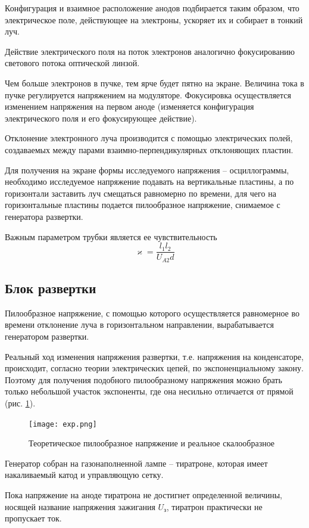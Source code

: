 Конфигурация и взаимное расположение анодов подбирается таким образом, что электрическое поле, действующее на электроны, ускоряет их и собирает в тонкий луч. 

Действие электрического поля на поток электронов аналогично фокусированию светового потока оптической линзой.

Чем больше электронов в пучке, тем ярче будет пятно на экране. Величина тока в пучке регулируется напряжением на модуляторе. Фокусировка осуществляется изменением напряжения на первом аноде (изменяется конфигурация электрического поля и его фокусирующее действие).

Отклонение электронного луча производится с помощью электрических полей, создаваемых между парами взаимно-перпендикулярных отклоняющих пластин. 

Для получения на экране формы исследуемого напряжения -- осциллограммы, необходимо исследуемое напряжение подавать на вертикальные пластины, а по горизонтали заставить луч смещаться равномерно по времени, для чего на горизонтальные пластины подается пилообразное напряжение, снимаемое с генератора развертки.

Важным параметром трубки является ее чувствительность $$\varkappa=\frac{l_1l_2}{U_{A2}d}$$

\subsection{Блок развертки}

Пилообразное напряжение, с помощью которого осуществляется равномерное во времени отклонение луча в горизонтальном направлении, вырабатывается генератором развертки.

Реальный ход изменения напряжения развертки, т.е. напряжения на конденсаторе, происходит, согласно теории электрических цепей, по экспоненциальному закону. Поэтому для получения подобного пилообразному напряжения можно брать только небольшой участок экспоненты, где она несильно отличается от прямой (рис. \ref{fig:exp}).

\begin{figure}[H]
	\centering
	\texttt{[image: exp.png]}
	\caption{Теоретическое пилообразное напряжение и реальное скалообразное}
	\label{fig:exp}
\end{figure}

Генератор собран на газонаполненной лампе -- тиратроне, которая имеет накаливаемый катод и управляющую сетку. 

Пока напряжение на аноде тиратрона не достигнет определенной величины, носящей название напряжения зажигания $U_\text{з}$, тиратрон практически не пропускает ток. 

